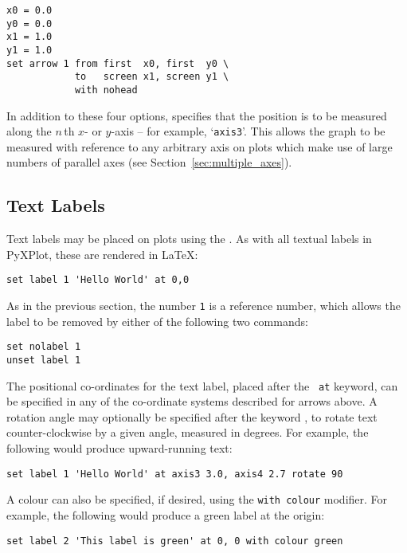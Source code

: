 \begin{verbatim}
x0 = 0.0
y0 = 0.0
x1 = 1.0
y1 = 1.0
set arrow 1 from first  x0, first  y0 \
            to   screen x1, screen y1 \
            with nohead
\end{verbatim}

In addition to these four options,  specifies that the
position is to be measured along the $n\,$th $x$- or $y$-axis -- for example,
`{\tt axis3}'.\indcmd{set arrow} This allows the graph to be measured with
reference to any arbitrary axis on plots which make use of large numbers of
parallel axes (see Section~\ref{sec:multiple_axes}).

\subsection{Text Labels}

Text labels may be placed on plots using the . As with all
textual labels in PyXPlot, these are rendered in \LaTeX:

\begin{verbatim}
set label 1 'Hello World' at 0,0
\end{verbatim}

As in the previous section, the number {\tt 1} is a reference number, which
allows the label to be removed by either of the following two commands:

\begin{verbatim}
set nolabel 1
unset label 1
\end{verbatim}

\noindent The positional co-ordinates for the text label, placed after the {\tt
at} keyword, can be specified in any of the co-ordinate systems described for
arrows above. A rotation angle may optionally be specified after the keyword
\indkeyt{rotate}, to rotate text counter-clockwise by a given angle, measured
in degrees. For example, the following would produce upward-running text:

\begin{verbatim}
set label 1 'Hello World' at axis3 3.0, axis4 2.7 rotate 90
\end{verbatim}

A colour can also be specified, if desired, using the {\tt with colour}
modifier.  For example, the following would produce a green label at the origin:

\begin{verbatim}
set label 2 'This label is green' at 0, 0 with colour green
\end{verbatim}

